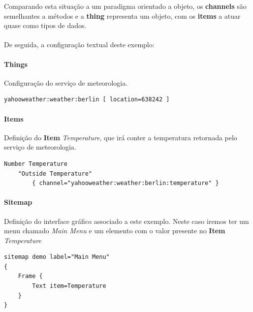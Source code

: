 Comparando esta situação a um paradigma orientado a objeto, os \textbf{channels} são semelhantes a métodos e a \textbf{thing} representa um objeto, com os \textbf{items} a atuar quase como tipos de dados.\\\\

De seguida, a configuração textual deste exemplo:

\paragraph*{Things}
\noindent
Configuração do serviço de meteorologia.

\begin{Verbatim}
yahooweather:weather:berlin [ location=638242 ]
\end{Verbatim}

\paragraph*{Items}
\noindent
Definição do \textbf{Item} \textit{Temperature}, que irá conter a temperatura retornada pelo serviço de meteorologia.

\begin{Verbatim}
Number Temperature
    "Outside Temperature"
        { channel="yahooweather:weather:berlin:temperature" }
\end{Verbatim}

\paragraph*{Sitemap}
\noindent
Definição do interface gráfico associado a este exemplo. Neste caso iremos ter um menu chamado \textit{Main Menu} e um elemento com o valor presente no \textbf{Item} \textit{Temperature}

\begin{Verbatim}
sitemap demo label="Main Menu"
{
	Frame {
		Text item=Temperature
	}
}
\end{Verbatim}


